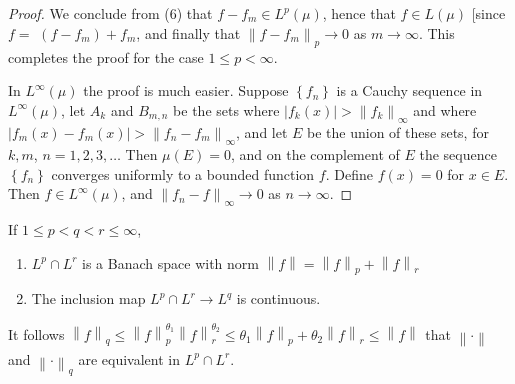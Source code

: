 \documentclass[12pt, a4paper, oneside]{book}
\begin{document}
\begin{theorem}
\begin{proof}
        We conclude from (6) that $f-f_{m} \in L^p(\mu)$, hence that $f \in L(\mu)$ [since $f=$ $\left(f-f_{m}\right)+f_{m}$, and finally that $\left\|f-f_{m}\right\|_{p} \rightarrow 0$ as $m \rightarrow \infty$. This completes the proof for the case $1 \leq p<\infty$.

        In $L^{\infty}(\mu)$ the proof is much easier. Suppose $\left\{f_{n}\right\}$ is a Cauchy sequence in $L^{\infty}(\mu)$, let $A_{k}$ and $B_{m, n}$ be the sets where $\left|f_{k}(x)\right|>\left\|f_{k}\right\|_{\infty}$ and where $\left|f_{m}(x)-f_{m}(x)\right|>\left\|f_{n}-f_{m}\right\|_{\infty}$, and let $E$ be the union of these sets, for $k, m$, $n=1,2,3, \ldots$ Then $\mu(E)=0$, and on the complement of $E$ the sequence $\left\{f_{n}\right\}$ converges uniformly to a bounded function $f$. Define $f(x)=0$ for $x \in E$. Then $f \in L^{\infty}(\mu)$, and $\left\|f_{n}-f\right\|_{\infty} \rightarrow 0$ as $n \rightarrow \infty$.
    \end{proof}
\end{theorem}



\begin{proposition}
    If $1 \leq p<q<r \leq \infty$,
    \begin{enumerate}
        \item
              $L^p \cap L^r$ is a Banach space with norm $\left\| f \right\|=\left\| f \right\|_{p}+\left\| f \right\|_{r}$
        \item
              The inclusion map $L^p \cap L^r \rightarrow L^q$ is continuous.
    \end{enumerate}
    \begin{remark}
        It follows $\left\| f \right\|_{q}\leq \left\| f \right\|_{p}^{\theta_1}\left\| f \right\|_{r}^{\theta_2}\leq \theta_1\left\| f \right\|_{p}+\theta_2\left\| f \right\|_{r} \leq \left\| f \right\|_{}$ that $\left\| \cdot \right\|_{}$ and $\left\| \cdot \right\|_{q}$ are equivalent in $L^p\cap L^r$.
    \end{remark}
\end{proposition}
\end{document}
